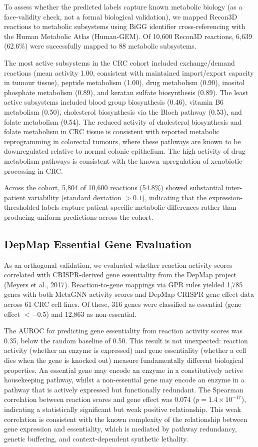 \documentclass[12pt,a4paper]{article}
\begin{document}
To assess whether the predicted labels capture known metabolic biology (as a face-validity check, not a formal biological validation), we mapped Recon3D reactions to metabolic subsystems using BiGG identifier cross-referencing with the Human Metabolic Atlas (Human-GEM). Of 10,600 Recon3D reactions, 6,639 (62.6\%) were successfully mapped to 88 metabolic subsystems.

The most active subsystems in the CRC cohort included exchange/demand reactions (mean activity 1.00, consistent with maintained import/export capacity in tumour tissue), peptide metabolism (1.00), drug metabolism (0.90), inositol phosphate metabolism (0.89), and keratan sulfate biosynthesis (0.89). The least active subsystems included blood group biosynthesis (0.46), vitamin B6 metabolism (0.50), cholesterol biosynthesis via the Bloch pathway (0.53), and folate metabolism (0.54). The reduced activity of cholesterol biosynthesis and folate metabolism in CRC tissue is consistent with reported metabolic reprogramming in colorectal tumours, where these pathways are known to be downregulated relative to normal colonic epithelium. The high activity of drug metabolism pathways is consistent with the known upregulation of xenobiotic processing in CRC.

Across the cohort, 5,804 of 10,600 reactions (54.8\%) showed substantial inter-patient variability (standard deviation $> 0.1$), indicating that the expression-thresholded labels capture patient-specific metabolic differences rather than producing uniform predictions across the cohort.

\subsection{DepMap Essential Gene Evaluation}

As an orthogonal validation, we evaluated whether reaction activity scores correlated with CRISPR-derived gene essentiality from the DepMap project (Meyers et al., 2017). Reaction-to-gene mappings via GPR rules yielded 1,785 genes with both MetaGNN activity scores and DepMap CRISPR gene effect data across 61 CRC cell lines. Of these, 316 genes were classified as essential (gene effect $< -0.5$) and 12,863 as non-essential.

The AUROC for predicting gene essentiality from reaction activity scores was 0.35, below the random baseline of 0.50. This result is not unexpected: reaction activity (whether an enzyme is expressed) and gene essentiality (whether a cell dies when the gene is knocked out) measure fundamentally different biological properties. An essential gene may encode an enzyme in a constitutively active housekeeping pathway, whilst a non-essential gene may encode an enzyme in a pathway that is actively expressed but functionally redundant. The Spearman correlation between reaction scores and gene effect was 0.074 ($p = 1.4 \times 10^{-17}$), indicating a statistically significant but weak positive relationship. This weak correlation is consistent with the known complexity of the relationship between gene expression and essentiality, which is mediated by pathway redundancy, genetic buffering, and context-dependent synthetic lethality.
\end{document}
